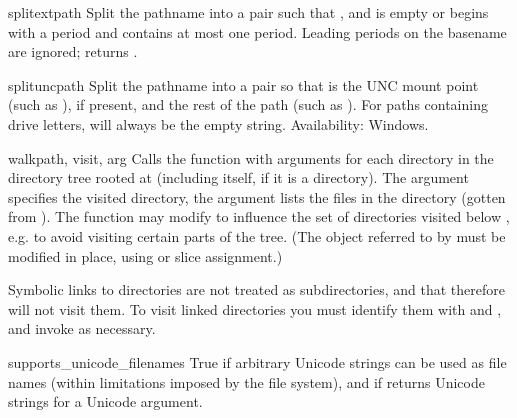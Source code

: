 \begin{funcdesc}{splitext}{path}
Split the pathname  into a pair  
such that ,
and  is empty or begins with a period and contains
at most one period. Leading periods on the basename are 
ignored;  returns 
.

\end{funcdesc}

\begin{funcdesc}{splitunc}{path}
Split the pathname  into a pair 
so that  is the UNC mount point (such as ),
if present, and  the rest of the path (such as 
).  For paths containing drive letters, 
will always be the empty string.
Availability:  Windows.
\end{funcdesc}

\begin{funcdesc}{walk}{path, visit, arg}
Calls the function  with arguments
 for each directory in the
directory tree rooted at  (including  itself, if it
is a directory).  The argument  specifies the visited
directory, the argument  lists the files in the directory
(gotten from ).
The  function may modify  to
influence the set of directories visited below , e.g. to
avoid visiting certain parts of the tree.  (The object referred to by
 must be modified in place, using  or slice
assignment.)

\begin{notice}
Symbolic links to directories are not treated as subdirectories, and
that  therefore will not visit them. To visit linked
directories you must identify them with
 and
, and invoke  as
necessary.
\end{notice}

\end{funcdesc}

\begin{datadesc}{supports_unicode_filenames}
True if arbitrary Unicode strings can be used as file names (within
limitations imposed by the file system), and if
 returns Unicode strings for a Unicode
argument.
\end{datadesc}
